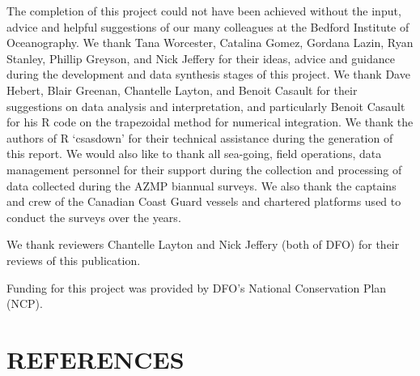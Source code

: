 \documentclass[12pt]{article}\usepackage[]{graphicx}\usepackage[]{color}
\begin{document}
The completion of this project could not have been achieved without the input, advice and helpful suggestions of our many colleagues at the Bedford Institute of Oceanography. We thank Tana Worcester, Catalina Gomez, Gordana Lazin, Ryan Stanley, Phillip Greyson, and Nick Jeffery for their ideas, advice and guidance during the development and data synthesis stages of this project. We thank Dave Hebert, Blair Greenan, Chantelle Layton, and Benoit Casault for their suggestions on data analysis and interpretation, and particularly Benoit Casault for his R code on the trapezoidal method for numerical integration. We thank the authors of R `csasdown' for their technical assistance during the generation of this report. We would also like to thank all sea-going, field operations, data management personnel for their support during the collection and processing of data collected during the AZMP biannual surveys. We also thank the captains and crew of the Canadian Coast Guard vessels and chartered platforms used to conduct the surveys over the years.

We thank reviewers Chantelle Layton and Nick Jeffery (both of DFO) for their reviews of this publication.

Funding for this project was provided by DFO's National Conservation Plan (NCP).

\clearpage

\clearpage

\hypertarget{sec:references}{%
\section{REFERENCES}\label{sec:references}}

\noindent \vspace{-2em} \setlength{\parindent}{-0.2in} \setlength{\leftskip}{0.2in} \setlength{\parskip}{8pt}
\end{document}
